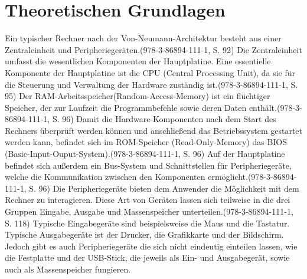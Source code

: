 \section{Theoretischen Grundlagen}
\label{sec:Theorie}
Ein typischer Rechner nach der Von-Neumann-Architektur besteht aus einer Zentraleinheit und Peripheriegeräten.(978-3-86894-111-1, S. 92) Die Zentraleinheit umfasst die wesentlichen Komponenten der Hauptplatine. Eine essentielle Komponente der Hauptplatine ist die CPU (Central Processing Unit), da sie für die Steuerung und Verwaltung der Hardware zuständig ist.(978-3-86894-111-1, S. 95) Der RAM-Arbeitsspeicher(Random-Access-Memory) ist ein flüchtiger Speicher, der zur Laufzeit die Programmbefehle sowie deren Daten enthält.(978-3-86894-111-1, S. 96) Damit die Hardware-Komponenten nach dem Start des Rechners überprüft werden können und anschließend das Betriebssystem gestartet werden kann, befindet sich im ROM-Speicher (Read-Only-Memory) das BIOS (Basic-Input-Ouput-System).(978-3-86894-111-1, S. 96) Auf der Hauptplatine befindet sich außerdem ein Bus-System und Schnittstellen für Peripheriegeräte, welche die Kommunikation zwischen den Komponenten ermöglicht.(978-3-86894-111-1, S. 96)
Die Peripheriegeräte bieten dem Anwender die Möglichkeit mit dem Rechner zu interagieren. Diese Art von Geräten lassen sich teilweise in die drei Gruppen Eingabe, Ausgabe und Massenspeicher unterteilen.(978-3-86894-111-1, S. 118) Typische Eingabegeräte sind beispielsweise die Maus und die Tastatur. Typische Ausgabegeräte ist der Drucker, die Grafikkarte und der Bildschirm. Jedoch gibt es auch Peripheriegeräte die sich nicht eindeutig einteilen lassen, wie die Festplatte und der USB-Stick, die jeweils als Ein- und Ausgabegerät, sowie auch als Massenspeicher fungieren.
